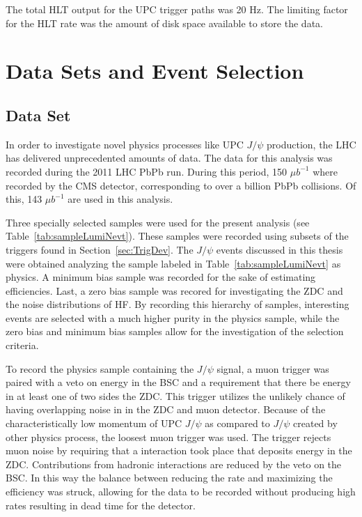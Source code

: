 	The total HLT output for the UPC trigger paths was 20 Hz. 
	The limiting factor for the HLT rate was the amount of disk space 
	  available to store the data. 

  \section{\label{sec:DataSetEvSel} Data Sets and Event Selection}
    \subsection{Data Set}
      In order to investigate novel physics processes like UPC $J/\psi$ 
       production, the LHC has delivered unprecedented amounts of data.
      The data for this analysis was recorded during the 2011 LHC PbPb run. 
      During this period, 150 $\mu$$b^{-1}$ where recorded by the CMS detector,
        corresponding to over a billion PbPb collisions. 
      Of this, 143 $\mu$$b^{-1}$ are used in this analysis.
  
      Three specially selected samples were used for the present analysis 
        (see Table~\ref{tab:sampleLumiNevt}).
      These samples were recorded using subsets of the triggers found in 
        Section~\ref{sec:TrigDev}.
      The $J/\psi$ events discussed in this thesis were obtained analyzing the 
      sample labeled in Table~\ref{tab:sampleLumiNevt} as physics.
      A minimum bias sample was recorded for the sake of estimating efficiencies.
      Last, a zero bias sample was recored for investigating the ZDC and the 
        noise distributions of HF.
      By recording this hierarchy of samples, interesting events are selected 
        with a much higher purity in the physics sample, while the zero bias and 
        minimum bias samples allow for the investigation of the selection 
        criteria. 
  
      To record the physics sample containing the $J/\psi$ signal, a muon trigger
        was paired with a veto on energy in the BSC and a requirement that there 
        be energy in at least one of two sides the ZDC. 
      This trigger utilizes the unlikely chance of having overlapping noise in
        in the ZDC and muon detector.
      Because of the characteristically low momentum of UPC $J/\psi$ as compared
        to $J/\psi$ created by other physics process, the loosest muon 
        trigger was used.
      The trigger rejects muon noise by requiring that a interaction took place
        that deposits energy in the ZDC.
      Contributions from hadronic interactions are reduced by the veto on the 
        BSC.
      In this way the balance between reducing the rate and maximizing the 
        efficiency was struck, allowing for the data to be recorded without 
        producing high rates resulting in dead time for the detector.  
      
